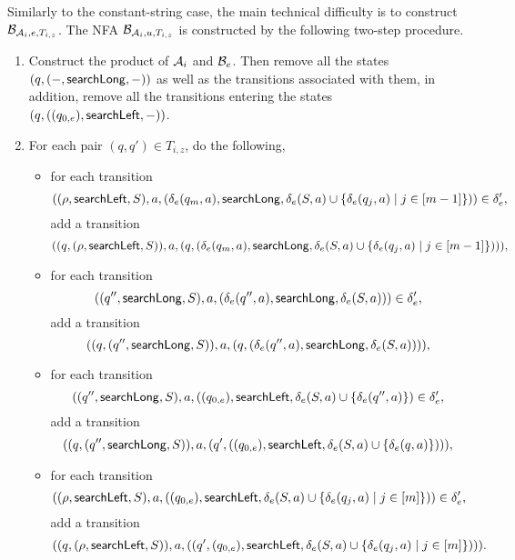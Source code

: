 Similarly to the constant-string case, the main technical difficulty is to construct $\mathcal{B}_{\mathcal{A}_i, e,  T_{i, z}}$. The NFA $\mathcal{B}_{\mathcal{A}_i, u,  T_{i, z}}$ is constructed by the following two-step procedure.
\begin{enumerate}
\item Construct the product of $\mathcal{A}_i$ and $\mathcal{B}_e$. Then remove all the states $(q, (-, \mathsf{searchLong}, -))$ as well as the transitions associated with them, in addition, remove all the transitions entering the states $(q, ((q_{0,e}), \mathsf{searchLeft},-))$.

\item For each pair $(q,q') \in T_{i,z}$, do the following,
\begin{itemize}
\item for each transition
$$((\rho, \mathsf{searchLeft}, S), a, (\delta_e(q_m, a), \mathsf{searchLong}, \delta_e(S,a) \cup \{\delta_e(q_j, a) \mid j \in [m-1]\})) \in \delta'_e,$$
add a transition
$$((q, (\rho, \mathsf{searchLeft}, S)), a, (q, (\delta_e(q_m, a), \mathsf{searchLong}, \delta_e(S,a) \cup \{\delta_e(q_j, a) \mid j \in [m-1]\}))),$$
%
\item for each transition 
$$((q'', \mathsf{searchLong}, S), a, (\delta_e(q'', a), \mathsf{searchLong}, \delta_e(S,a))) \in \delta'_e,$$  
add a transition 
$$((q, (q'', \mathsf{searchLong}, S)), a, (q, (\delta_e(q'', a), \mathsf{searchLong}, \delta_e(S,a)))),$$
%
\item for each transition
$$((q'', \mathsf{searchLong}, S), a, ((q_{0,e}), \mathsf{searchLeft}, \delta_e(S,a) \cup \{\delta_e(q'',a)\}) \in \delta'_e,$$
add a transition
$$((q, (q'', \mathsf{searchLong}, S)), a, (q', ((q_{0,e}), \mathsf{searchLeft}, \delta_e(S,a) \cup \{\delta_e(q,a)\}))),$$
%
\item for each transition
$$((\rho, \mathsf{searchLeft}, S), a, ((q_{0,e}), \mathsf{searchLeft}, \delta_e(S,a) \cup \{\delta_e(q_j, a) \mid j \in [m]\})) \in \delta'_e,$$
add a transition
$$((q, (\rho, \mathsf{searchLeft}, S)), a, ((q', (q_{0,e}), \mathsf{searchLeft}, \delta_e(S,a) \cup \{\delta_e(q_j, a) \mid j \in [m]\}))).$$
\end{itemize}
\end{enumerate}




